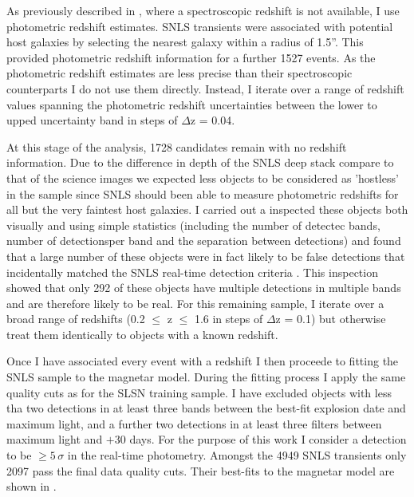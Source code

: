 As previously described in , where a spectroscopic redshift is not available, I use photometric redshift estimates. SNLS transients were associated with potential host galaxies by selecting the nearest galaxy within a radius of 1.5''. This provided photometric redshift information for a further 1527 events. As the photometric redshift estimates are less precise than their spectroscopic counterparts I do not use them directly. Instead, I iterate over a range of redshift values spanning the photometric redshift uncertainties between the lower to upped uncertainty band in steps of $\Delta$z = 0.04.

At this stage of the analysis, 1728 candidates remain with no redshift information. Due to the difference in depth of the SNLS deep stack compare to that of the science images we expected less objects to be considered as 'hostless' in the sample since SNLS should been able to measure photometric redshifts for all but the very faintest host galaxies. I carried out a inspected these objects both visually and using simple statistics (including the number of detectec bands, number of detectionsper band and the separation between detections) and found that a large number of these objects were in fact likely to be false detections that incidentally matched the SNLS real-time detection criteria \citep{Perrett2010}. This inspection showed that only 292 of these objects have multiple detections in multiple bands and are therefore likely to be real. For this remaining sample, I iterate over a broad range of redshifts (0.2 $\leq$ z $\leq$ 1.6 in steps of $\Delta$z = 0.1) but otherwise treat them identically to objects with a known redshift.

Once I have associated every event with a redshift I then proceede to fitting the SNLS sample to the magnetar model. During the fitting process I apply the same quality cuts as for the SLSN training sample. I have excluded objects with less tha two detections in at least three bands between the best-fit explosion date and maximum light, and a further two detections in at least three filters between maximum light and $+30$ days. For the purpose of this work I consider a detection to be $\geq5$\,$\sigma$ in the real-time photometry. Amongst the 4949 SNLS transients only 2097 pass the final data quality cuts. Their best-fits to the magnetar model are shown in .


